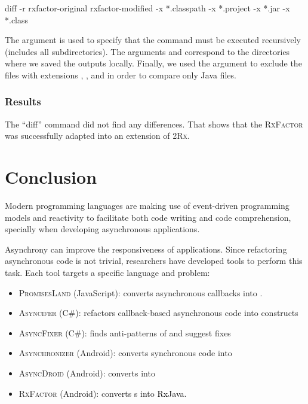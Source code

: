 \documentclass[type=bsc,accentcolor=tud9c]{tudthesis}
\newcommand{\framework}[1]{\textcolor{black}{#1}}
\newcommand{\toolcore}{\textsc{2Rx}}
\begin{document}
\begin{textcode}{}
diff -r rxfactor-original rxfactor-modified -x *.classpath -x *.project -x *.jar -x *.class
\end{textcode}

The argument  is used to specify that the command must be executed recursively (includes all subdirectories). The arguments  and  correspond to the directories where we saved the outputs locally. Finally, we used the argument  to exclude the files with extensions , ,  and  in order to compare only \framework{Java} files.

\subsection{Results}
The ``diff'' command did not find any differences. That shows that the \textsc{RxFactor} was successfully adapted into an extension of \toolcore{}.

\chapter{Conclusion}
\label{chapter:conclusion}
Modern programming languages are making use of event-driven programming models and reactivity to facilitate both code writing and code comprehension, specially when developing asynchronous applications.

Asynchrony can improve the responsiveness of applications. Since refactoring asynchronous code is not trivial, researchers have developed tools to perform this task. Each tool targets a specific language and problem:

\begin{itemize}
	\item \textsc{PromisesLand} (JavaScript): converts asynchronous callbacks into .
	\item \textsc{Asyncifer} (C\#): refactors callback-based asynchronous code into  constructs
	\item \textsc{AsyncFixer} (C\#): finds anti-patterns of  and suggest fixes
	\item \textsc{Asynchronizer} (Android): converts synchronous code into 
	\item \textsc{AsyncDroid} (Android): converts  into 
	\item \textsc{RxFactor} (Android): converts s into \framework{RxJava}.
\end{itemize}
\end{document}
